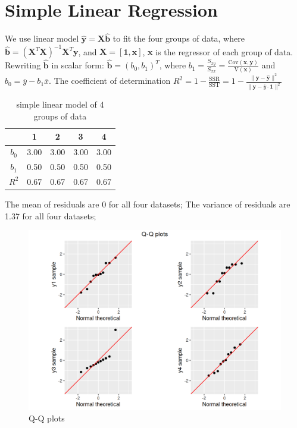 \documentclass[12pt]{article}
\begin{document}
	\section{Simple Linear Regression}

%

	We use linear model 
	$\hat{\mathbf{y}} = \mathbf{X}\hat{\mathbf{b}}$  
	to fit the four groups of data, where 
	$\hat{\mathbf{b}} = (\mathbf{X}^T\mathbf{X})^{-1}\mathbf{X}^T\mathbf{y}$,
	and $\mathbf{X} = [\mathbf{1}, \mathbf{x}]$, $\mathbf{x}$ is the regressor of each group of data. 
	Rewriting $\hat{\mathbf{b}}$ in scalar form: 
	$\hat{\mathbf{b}} = \left( b_0,b_1 \right)^T $,
	where $b_1 = \frac{S_{xy}}{S_{xx}} = \frac{\text{Cov}(\mathbf{x},\mathbf{y})}{\text{V}(\mathbf{x})}$ 
	and $b_0 = \overline{y} - b_1 \overline{x}$. 
	The coefficient of determination $R^2 =1-\frac{\text{SSR}}{\text{SST}} = 1 - \frac{\rVert \mathbf{y} - \hat{\mathbf{y}}\rVert^2}{\rVert \mathbf{y} - \overline{y}\cdot\mathbf{1}\rVert^2} $

	\begin{table}[htpb]
		\centering
		\label{tab:1}
		\begin{tabular}{|c|c|c|c|c|}
			\hline
			 & 1 & 2 & 3 & 4  \\
			\hline
			$b_0$ & 3.00 & 3.00 & 3.00 & 3.00  \\
			\hline
			$b_1$ & 0.50 & 0.50 & 0.50 & 0.50  \\
			\hline
			$R^2$ & 0.67 & 0.67 & 0.67 & 0.67  \\
			\hline

		\end{tabular}
		\caption{simple linear model of 4 groups of data}
	\end{table}

	The mean of residuals are 0 for all four datasets; 
	The variance of residuals are 1.37 for all four datasets; 


\begin{figure}[htbp]
\includegraphics[width=.7\textwidth]{QQplot.png}
\centering
\caption{Q-Q plots}
\label{Fig:qqplot}
\end{figure}
\end{document}

